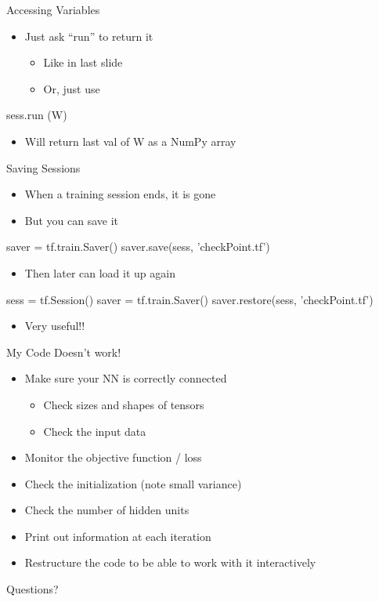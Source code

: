 \documentclass[aspectratio=169]{beamer}
\begin{document}
\begin{frame}[fragile]{Accessing Variables}

\begin{itemize}
\item Just ask ``run'' to return it 
\begin{itemize}
	\item Like in last slide
	\item Or, just use
\end{itemize}
\end{itemize}
\begin{SQL}
sess.run (W)
\end{SQL}
\begin{itemize}
	\item Will return last val of W as a NumPy array
\end{itemize}
\end{frame}
\begin{frame}[fragile]{Saving Sessions}

\begin{itemize}
\item When a training session ends, it is gone
\item But you can save it
\end{itemize}
\begin{SQL}
saver = tf.train.Saver() 
saver.save(sess, 'checkPoint.tf')
\end{SQL}
\begin{itemize}
\item Then later can load it up again
\end{itemize}
\begin{SQL}
sess = tf.Session()
saver = tf.train.Saver()
saver.restore(sess, 'checkPoint.tf')
\end{SQL}
\begin{itemize}
\item Very useful!!
\end{itemize}
\end{frame}
\begin{frame}[fragile]{My Code Doesn't work!}

\begin{itemize}
\item Make sure your NN is correctly connected
\begin{itemize}
\item Check sizes and shapes of tensors
\item Check the input data
\end{itemize}
\item Monitor the objective function / loss
\item Check the initialization (note small variance)
\item Check the number of hidden units
\item Print out information at each iteration
\item Restructure the code to be able to work with it interactively
\end{itemize}
\end{frame}
\begin{frame}{Questions?}
\end{frame}
\end{document}
